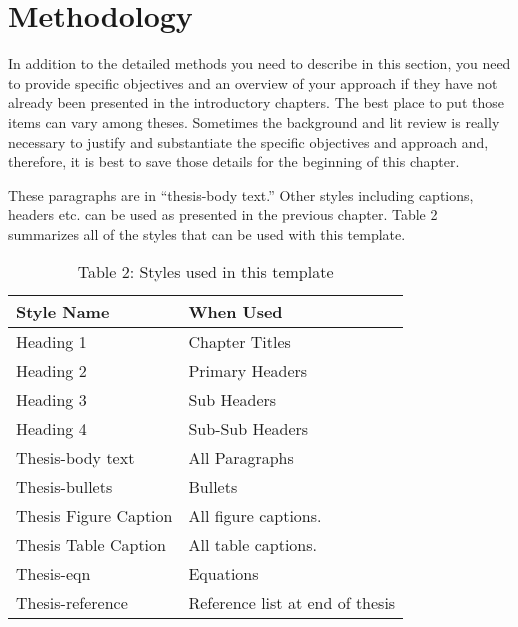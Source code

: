\chapter{Methodology} \label{chapterMethodology}



In addition to the detailed methods you need to describe in this section, you need to provide specific objectives and an overview of your approach if they have not already been presented in the introductory chapters.  The best place to put those items can vary among theses.  Sometimes the background and lit review is really necessary to justify and substantiate the specific objectives and approach and, therefore, it is best to save those details for the beginning of this chapter.

These paragraphs are in “thesis-body text.”  Other styles including captions, headers etc. can be used as presented in the previous chapter.  Table 2 summarizes all of the styles that can be used with this template.

\begin{table}[ht]
  \centering
  \begin{tabularx}{0.8\textwidth} {
    | >{\centering\arraybackslash}X 
    | >{\centering\arraybackslash}X |
  }
    \hline
      Style Name & When Used \\ 
    \hline\hline
      Heading 1 & Chapter Titles \\
      Heading 2 & Primary Headers \\
      Heading 3 & Sub Headers \\
      Heading 4 & Sub-Sub Headers \\
      Thesis-body text & All Paragraphs \\
      Thesis-bullets & Bullets \\
      Thesis Figure Caption & All figure captions. \\
      Thesis Table Caption & All table captions. \\
      Thesis-eqn & Equations \\
      Thesis-reference & Reference list at end of thesis \\
    \hline
  \end{tabularx}
  \caption{Table 2: Styles used in this template}
  \label{table:2}
\end{table}

